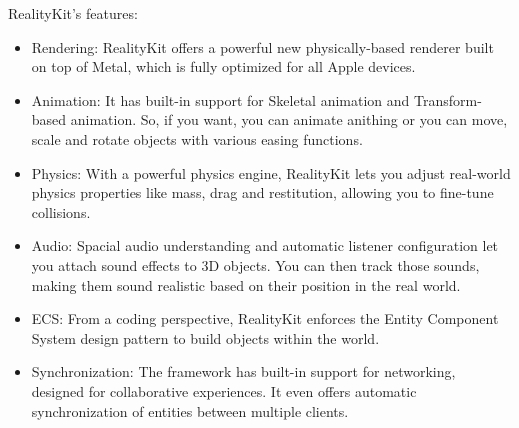 RealityKit’s features:
\begin{itemize}
    \item Rendering: RealityKit offers a powerful new physically-based renderer built on top of Metal, which is fully optimized for all Apple devices.

    \item Animation: It has built-in support for Skeletal animation and Transform-based animation. So, if you want, you can animate anithing or you can move, scale and rotate objects with various easing functions.

    \item Physics: With a powerful physics engine, RealityKit lets you adjust real-world physics properties like mass, drag and restitution, allowing you to fine-tune collisions.

    \item Audio: Spacial audio understanding and automatic listener configuration let you attach sound effects to 3D objects. You can then track those sounds, making them sound realistic based on their position in the real world.

    \item ECS: From a coding perspective, RealityKit enforces the Entity Component System design pattern to build objects within the world.

    \item Synchronization: The framework has built-in support for networking, designed for collaborative experiences. It even offers automatic synchronization of entities between multiple clients.
\end{itemize}
\cite{appleArRealityKit}
\cite{appleArKit}

